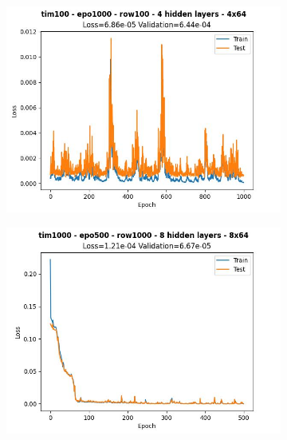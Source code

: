 \begin{figure}[H]
\begin{subfigure}{.47\linewidth}
        \includegraphics[width=\textwidth]{other-models/2024-05-20T20:25:40.045171_pendulum_tim100_epo1000_row100.jpg}
    \end{subfigure}
    \begin{subfigure}{.47\linewidth}
        \centering
        \includegraphics[width=\textwidth]{other-models/2024-05-20T21:52:18.416130_pendulum_tim1000_epo500_row1000.jpg}
    \end{subfigure}
\end{figure}
